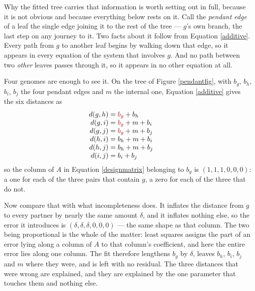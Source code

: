 \documentclass[pdflatex,sn-vancouver-num]{sn-jnl}
\begin{document}
Why the fitted tree carries that information is worth setting out in full, because it is not obvious
and because everything below rests on it. Call the \emph{pendant edge} of a leaf the single edge
joining it to the rest of the tree --- $g$'s own branch, the last step on any journey to it. Two facts about it follow from
Equation \eqref{additive}. Every path from $g$ to another leaf begins by walking down that edge, so it
appears in every equation of the system that involves $g$. And no path between two \emph{other} leaves
passes through it, so it appears in no other equation at all.

Four genomes are enough to see it. On the tree of Figure \ref{pendantfig}, with $b_g$, $b_h$, $b_i$,
$b_j$ the four pendant edges and $m$ the internal one, Equation \eqref{additive} gives the six
distances as
%
\[
  \begin{array}{r@{\;=\;}l@{\qquad}l}
    d(g,h) & \textcolor{red!70!black}{b_g} + b_h            & \\
    d(g,i) & \textcolor{red!70!black}{b_g} + m + b_i        & \\
    d(g,j) & \textcolor{red!70!black}{b_g} + m + b_j        & \\
    d(h,i) & b_h + m + b_i                                  & \\
    d(h,j) & b_h + m + b_j                                  & \\
    d(i,j) & b_i + b_j                                      &
  \end{array}
\]
%
so the column of $A$ in Equation \eqref{designmatrix} belonging to $b_g$ is $(1,1,1,0,0,0)$: a one for
each of the three pairs that contain $g$, a zero for each of the three that do not.

Now compare that with what incompleteness does. It inflates the distance from $g$ to every partner by
nearly the same amount $\delta$, and it inflates nothing else, so the error it introduces is
$(\delta,\delta,\delta,0,0,0)$ --- the same shape as that column. The two being proportional is the
whole of the matter: least squares assigns the part of an error lying along a column of $A$ to that
column's coefficient, and here the entire error lies along one column. The fit therefore lengthens
$b_g$ by $\delta$, leaves $b_h$, $b_i$, $b_j$ and $m$ where they were, and is left with no residual.
The three distances that were wrong are explained, and they are explained by the one parameter that
touches them and nothing else.
\end{document}
